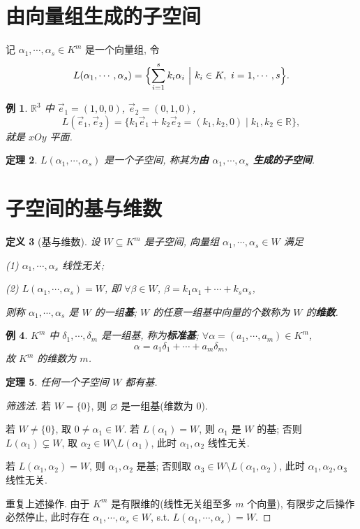 \documentclass[UTF8,11pt]{ctexart}
\theoremstyle{cnthm}
\newtheorem{thm}{定理}[section]
\newtheorem{defn}[thm]{定义}
\newtheorem{exa}[thm]{例}
\begin{document}
\section{由向量组生成的子空间}

记 $\alpha_1,\cdots,\alpha_s\in K^m$ 是一个向量组, 令
\[
L(\alpha_1,\cdots,\alpha_s)=\Bigl\{\sum_{i=1}^{s}k_i\alpha_i\ \Big|\ k_i\in K,\ i=1,\cdots,s\Bigr\} .
\]

\begin{exa}
$\mathbb{R}^3$ 中 $\vec e_1=(1,0,0)$, $\vec e_2=(0,1,0)$,
\[
L(\vec e_1,\vec e_2)=\{k_1\vec e_1+k_2\vec e_2=(k_1,k_2,0)\mid k_1,k_2\in\mathbb{R}\},
\]
就是 $xOy$ 平面.
\end{exa}

\begin{thm}
$L(\alpha_1,\cdots,\alpha_s)$ 是一个子空间, 称其为\textbf{由 $\alpha_1,\cdots,\alpha_s$ 生成的子空间}.
\end{thm}

\section{子空间的基与维数}

\begin{defn}[基与维数]
设 $W\subseteq K^m$ 是子空间, 向量组 $\alpha_1,\cdots,\alpha_s\in W$ 满足

(1) $\alpha_1,\cdots,\alpha_s$ 线性无关;

(2) $L(\alpha_1,\cdots,\alpha_s)=W$, 即 $\forall\beta\in W$, $\beta=k_1\alpha_1+\cdots+k_s\alpha_s$,

则称 $\alpha_1,\cdots,\alpha_s$ 是 $W$ 的一组\textbf{基}; $W$ 的任意一组基中向量的个数称为 $W$ 的\textbf{维数}.
\end{defn}

\begin{exa}
$K^m$ 中 $\delta_1,\cdots,\delta_m$ 是一组基, 称为\textbf{标准基}; $\forall\alpha=(a_1,\cdots,a_m)\in K^m$,
\[
\alpha=a_1\delta_1+\cdots+a_m\delta_m ,
\]
故 $K^m$ 的维数为 $m$.
\end{exa}

\begin{thm}
任何一个子空间 $W$ 都有基.
\end{thm}

\begin{proof}[筛选法]
若 $W=\{0\}$, 则 $\varnothing$ 是一组基(维数为 $0$).

若 $W\neq\{0\}$, 取 $0\neq\alpha_1\in W$. 若 $L(\alpha_1)=W$, 则 $\alpha_1$ 是 $W$ 的基; 否则 $L(\alpha_1)\subsetneq W$, 取 $\alpha_2\in W\setminus L(\alpha_1)$, 此时 $\alpha_1,\alpha_2$ 线性无关.

若 $L(\alpha_1,\alpha_2)=W$, 则 $\alpha_1,\alpha_2$ 是基; 否则取 $\alpha_3\in W\setminus L(\alpha_1,\alpha_2)$, 此时 $\alpha_1,\alpha_2,\alpha_3$ 线性无关.

重复上述操作. 由于 $K^m$ 是有限维的(线性无关组至多 $m$ 个向量), 有限步之后操作必然停止, 此时存在 $\alpha_1,\cdots,\alpha_s\in W$, s.t. $L(\alpha_1,\cdots,\alpha_s)=W$.
\end{proof}
\end{document}
